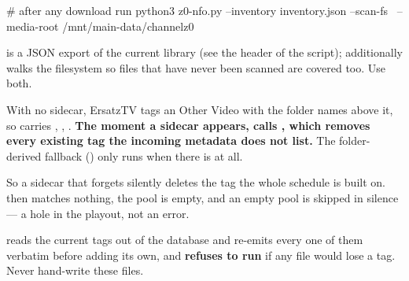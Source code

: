 \documentclass[fontpath=fonts/,logopath=logo/]{riposte-doc}
\begin{document}
\ripcodeopen
{}
\begin{ripcodeblock}
# after any download run
python3 z0-nfo.py --inventory inventory.json --scan-fs \
                  --media-root /mnt/main-data/channelz0
\end{ripcodeblock}
\ripcodesizereset\ripcodeclose

 is a JSON export of the current library (see the header of the script);  additionally walks the filesystem so files that have never been scanned are covered too. Use both.



With no sidecar, ErsatzTV tags an Other Video with the folder names above it, so  carries , , . \textbf{The moment a sidecar appears,  calls , which removes every existing tag the incoming metadata does not list.} The folder-derived fallback () only runs when there is   at all.

So a sidecar that forgets  silently deletes the tag the whole schedule is built on.  then matches nothing, the pool is empty, and an empty pool is skipped in silence — a hole in the playout, not an error.

 reads the current tags out of the database and re-emits every one of them verbatim before adding its own, and \textbf{refuses to run} if any file would lose a tag. Never hand-write these files.


\end{document}
